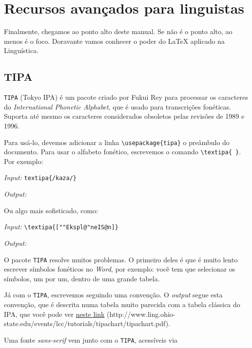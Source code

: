 \chapter{Recursos avançados para linguistas}

Finalmente, chegamos ao ponto alto deste manual. Se não é o ponto alto, ao menos é o foco. Doravante vamos conhecer o poder do \LaTeX{} aplicado na Linguística.

\section{TIPA}

\texttt{TIPA} (Tokyo IPA) é um pacote criado por Fukui Rey para processar os caracteres do \emph{International Phonetic Alphabet}, que é usado para transcrições fonéticas. Suporta até mesmo os caracteres considerados obsoletos pelas revisões de 1989 e 1996.

Para usá-lo, devemos adicionar a linha \verb+\usepackage{tipa}+ o preâmbulo do documento. Para usar o alfabeto fonético, escrevemos o comando \verb+\textipa{ }+. Por exemplo:

\begin{center}
\emph{Input:} \verb+textipa{/kaza/}+

\emph{Output:} 
\end{center}

Ou algo mais sofisticado, como:

\begin{center}
\emph{Input:} \verb+\textipa{[""Ekspl@"neIS@n]}+

\emph{Output:} 
\end{center}

O pacote \texttt{TIPA} resolve muitos problemas. O primeiro deles é que é muito lento escrever símbolos fonéticos no \emph{Word}, por exemplo: você tem que selecionar os símbolos, um por um, dentro de uma grande tabela.

Já com o \texttt{TIPA}, escrevemos seguindo uma convenção. O \emph{output} segue esta convenção, que é descrita numa tabela muito parecida com a tabela clássica do IPA, que você pode ver \href{http://www.ling.ohio-state.edu/events/lcc/tutorials/tipachart/tipachart.pdf}{neste link} (\textsf{http://www.ling.ohio-state.edu/events/lcc/tutorials/t\-ipa\-chart/t\-ipa\-chart.pdf}).

Uma fonte \emph{sans-serif} vem junto com o \texttt{TIPA}, acessíveis via 

